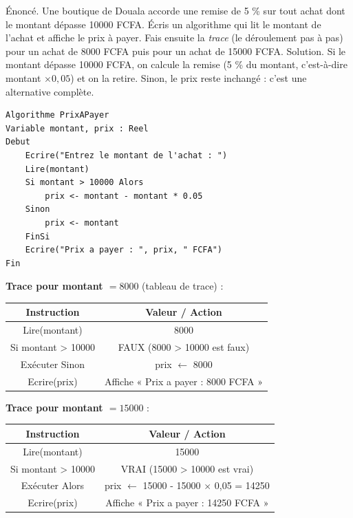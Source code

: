 \documentclass[11pt]{article}
\begin{document}
\begin{exoresolu}[La remise de 5 \%]
Énoncé. Une boutique de Douala accorde une remise de 5 \% sur tout achat dont le montant dépasse \num{10000} FCFA. Écris un algorithme qui lit le montant de l'achat et affiche le prix à payer. Fais ensuite la \emph{trace} (le déroulement pas à pas) pour un achat de \num{8000} FCFA puis pour un achat de \num{15000} FCFA.
\tcblower
Solution. Si le montant dépasse \num{10000} FCFA, on calcule la remise (5 \% du montant, c'est-à-dire montant $\times 0{,}05$) et on la retire. Sinon, le prix reste inchangé : c'est une alternative complète.
\begin{lstlisting}
Algorithme PrixAPayer
Variable montant, prix : Reel
Debut
    Ecrire("Entrez le montant de l'achat : ")
    Lire(montant)
    Si montant > 10000 Alors
        prix <- montant - montant * 0.05
    Sinon
        prix <- montant
    FinSi
    Ecrire("Prix a payer : ", prix, " FCFA")
Fin
\end{lstlisting}
\textbf{Trace pour montant $= \num{8000}$} (tableau de trace) :
\begin{center}
\begin{tabular}{|c|c|}
\hline
\textbf{Instruction} & \textbf{Valeur / Action} \\
\hline
Lire(montant) & 8000 \\
\hline
Si montant > 10000 & FAUX (8000 > 10000 est faux) \\
\hline
Exécuter Sinon & prix $\leftarrow$ 8000 \\
\hline
Ecrire(prix) & Affiche « Prix a payer : 8000 FCFA » \\
\hline
\end{tabular}
\end{center}

\textbf{Trace pour montant $= \num{15000}$} :
\begin{center}
\begin{tabular}{|c|c|}
\hline
\textbf{Instruction} & \textbf{Valeur / Action} \\
\hline
Lire(montant) & 15000 \\
\hline
Si montant > 10000 & VRAI (15000 > 10000 est vrai) \\
\hline
Exécuter Alors & prix $\leftarrow$ 15000 - 15000 $\times$ 0,05 = 14250 \\
\hline
Ecrire(prix) & Affiche « Prix a payer : 14250 FCFA » \\
\hline
\end{tabular}
\end{center}
\end{exoresolu}
\end{document}
